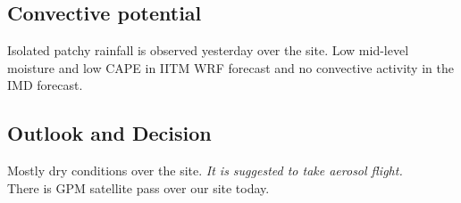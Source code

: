 \subsection*{Convective potential}
Isolated patchy rainfall is observed yesterday over the site. Low mid-level moisture and low CAPE in IITM WRF forecast and no convective activity in the IMD forecast. 

\subsection*{Outlook and Decision}
Mostly dry conditions over the site. \emph{It is suggested to take aerosol flight.}\\ %
There is GPM satellite pass over our site today.




